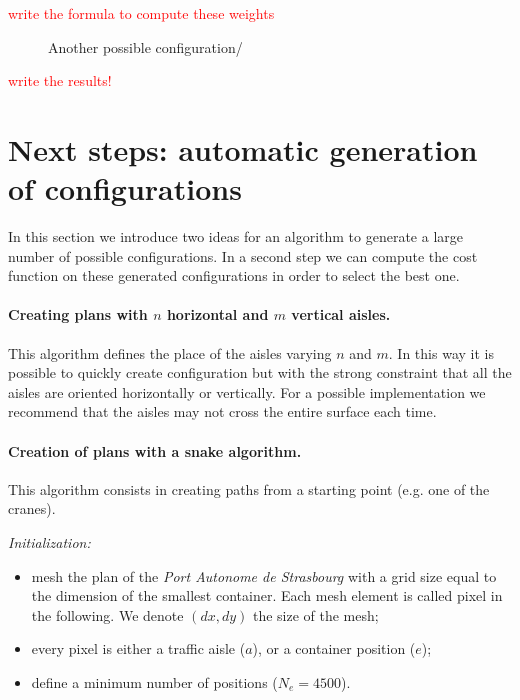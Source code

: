 \documentclass{article}
\newcommand{\ls}[1]{\textcolor{red}{#1}}
\newcommand{\PAS}{\emph{Port Autonome de Strasbourg }}
\begin{document}
 \ls{write the formula to compute these weights}


\begin{figure}[!htb]
\centering

\caption{Another possible configuration/}
\label{fig:2D_PAS_actuel} 
\end{figure}

\ls{write the results!}

\section{Next steps: automatic generation of configurations} 

In this section we introduce two ideas for an algorithm to generate a large number of possible configurations.
In a second step we can compute the cost function on these generated configurations in order to select the best one.

\paragraph{Creating plans with $ n $ horizontal and $ m $ vertical aisles.} 
This algorithm defines the place of the aisles varying $ n $ and $ m $. 
In this way it is possible to quickly create configuration but with the strong constraint that all the aisles are oriented horizontally or vertically. 
For a possible implementation we recommend that the aisles may not cross the entire surface each time.

\paragraph{Creation of plans with a snake algorithm.}
This algorithm consists in creating paths from a starting point (e.g. one of the cranes). %

\noindent
\textit{Initialization:}
\begin{itemize}
	\item mesh the plan of the \PAS with a grid size equal to the dimension of the smallest container. Each mesh element is called pixel in the following. We denote $ (dx, dy) $ the size of the mesh;
	\item every pixel is either a traffic aisle ($ a $), or a container position ($ e $);
	\item define a minimum number of positions ($N_e=4500$). 
\end{itemize}
\end{document}
